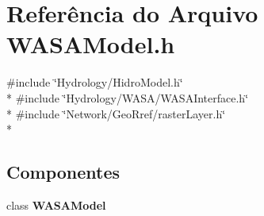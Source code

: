 \section{Referência do Arquivo W\+A\+S\+A\+Model.\+h}
\label{_w_a_s_a_model_8h}
{\ttfamily \#include \char`\"{}Hydrology/\+Hidro\+Model.\+h\char`\"{}}\\*
{\ttfamily \#include \char`\"{}Hydrology/\+W\+A\+S\+A/\+W\+A\+S\+A\+Interface.\+h\char`\"{}}\\*
{\ttfamily \#include \char`\"{}Network/\+Geo\+Rref/raster\+Layer.\+h\char`\"{}}\\*
\subsection*{Componentes}
\begin{DoxyCompactItemize}
\item 
class {\bf W\+A\+S\+A\+Model}
\end{DoxyCompactItemize}
